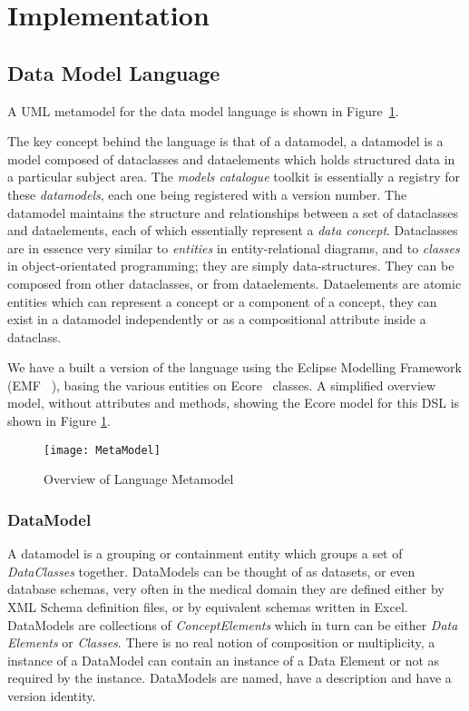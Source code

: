 \section{Implementation}

\subsection{Data Model Language}

A UML metamodel for the data model language is shown in
Figure~\ref{fig:mcSimplifiedOverview}. 


The key concept behind the language is that of a datamodel, a
datamodel is a model composed of dataclasses and dataelements which
holds structured data in a particular subject area. The \emph{models
  catalogue} toolkit is essentially a registry for these
\emph{datamodels}, each one being registered with a version
number. The datamodel maintains the structure and relationships
between a set of dataclasses and dataelements, each of which
essentially represent a \emph{data concept}. Dataclasses are in
essence very similar to \emph{entities} in entity-relational diagrams,
and to \emph{classes} in object-orientated programming; they are
simply data-structures. They can be composed from other dataclasses,
or from dataelements. Dataelements are atomic entities which can
represent a concept or a component of a concept, they can exist in a
datamodel independently or as a compositional attribute inside a
dataclass. 

We have a built a version of the language using the Eclipse Modelling
Framework (EMF ~\cite{EMF}), basing the various entities on
Ecore~\cite{ECORE} classes. A simplified overview model, without
attributes and methods, showing the Ecore model for this DSL is shown
in Figure \ref{fig:mcSimplifiedOverview}.


\begin{figure}[here]
  \texttt{[image: MetaModel]}
  \caption{Overview of Language Metamodel} 
  \label{fig:mcSimplifiedOverview}
\end{figure}

\subsubsection{DataModel}

A datamodel is a grouping or containment entity which groups a set of
\emph{DataClasses} together. DataModels can be thought of as datasets,
or even database schemas, very often in the medical domain they are
defined either by XML Schema definition files, or by equivalent
schemas written in Excel.  DataModels are collections of
\emph{ConceptElements} which in turn can be either \emph{Data
  Elements} or \emph{Classes}. There is no real notion of composition
or multiplicity, a instance of a DataModel can contain an instance of
a Data Element or not as required by the instance.  DataModels are
named, have a description and have a version identity.

